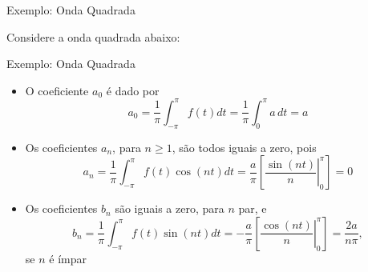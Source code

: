 \begin{frame}[fragile]{Exemplo: Onda Quadrada}

    Considere a onda quadrada abaixo:

    \begin{figure}
        \centering

    \end{figure}

\end{frame}

\begin{frame}[fragile]{Exemplo: Onda Quadrada}

    \begin{itemize}
        \item O coeficiente $a_0$ é dado por
        \[
            a_0 = \frac{1}{\pi}\int_{-\pi}^{\pi} f(t)dt = \frac{1}{\pi}\int_{0}^{\pi} a\, dt = a
        \]

        \item Os coeficientes $a_n$, para $n\geq 1$, são todos iguais a zero, pois
        \[
            a_n = \frac{1}{\pi}\int_{-\pi}^{\pi} f(t)\cos(nt) dt 
                = \frac{a}{\pi}\left[\left.\frac{\sin(nt)}{n}\right\rvert_0^\pi\right] = 0
        \]

        \item Os coeficientes $b_n$ são iguais a zero, para $n$ par, e
        \[
            b_n = \frac{1}{\pi}\int_{-\pi}^{\pi} f(t)\sin(nt) dt 
                = -\frac{a}{\pi}\left[\left.\frac{\cos(nt)}{n}\right\rvert_0^\pi\right] = \frac{2a}{n\pi},
        \]
        se $n$ é ímpar
    \end{itemize}

\end{frame}

